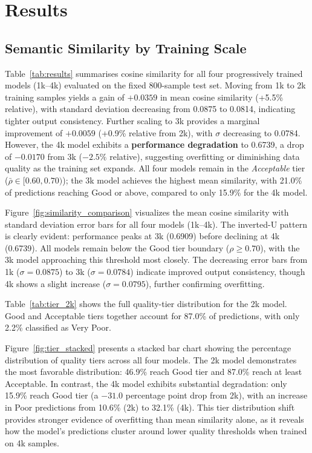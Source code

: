 \documentclass[twocolumn]{article}
\begin{document}
\section{Results}
\label{sec:results}

\subsection{Semantic Similarity by Training Scale}

Table~\ref{tab:results} summarises cosine similarity for all four progressively
trained models (1k--4k) evaluated on the fixed 800-sample test set.
Moving from 1k to 2k training samples yields a gain of $+0.0359$ in mean
cosine similarity (+5.5\% relative), with standard deviation decreasing from
0.0875 to 0.0814, indicating tighter output consistency.
Further scaling to 3k provides a marginal improvement of $+0.0059$
(+0.9\% relative from 2k), with $\sigma$ decreasing to 0.0784.
However, the 4k model exhibits a \textbf{performance degradation} to 0.6739,
a drop of $-0.0170$ from 3k ($-2.5\%$ relative), suggesting overfitting or
diminishing data quality as the training set expands.
All four models remain in the \textit{Acceptable} tier ($\bar{\rho}\in[0.60,0.70)$);
the 3k model achieves the highest mean similarity, with 21.0\% of predictions
reaching Good or above, compared to only 15.9\% for the 4k model.

Figure~\ref{fig:similarity_comparison} visualizes the mean cosine similarity
with standard deviation error bars for all four models (1k--4k).
The inverted-U pattern is clearly evident: performance peaks at 3k (0.6909)
before declining at 4k (0.6739).
All models remain below the Good tier boundary ($\rho\geq 0.70$), with the
3k model approaching this threshold most closely.
The decreasing error bars from 1k ($\sigma=0.0875$) to 3k ($\sigma=0.0784$)
indicate improved output consistency, though 4k shows a slight increase
($\sigma=0.0795$), further confirming overfitting.

Table~\ref{tab:tier_2k} shows the full quality-tier distribution for the
2k model.
Good and Acceptable tiers together account for 87.0\% of predictions,
with only 2.2\% classified as Very Poor.

Figure~\ref{fig:tier_stacked} presents a stacked bar chart showing the
percentage distribution of quality tiers across all four models.
The 2k model demonstrates the most favorable distribution: 46.9\% reach
Good tier and 87.0\% reach at least Acceptable.
In contrast, the 4k model exhibits substantial degradation: only 15.9\%
reach Good tier (a $-31.0$ percentage point drop from 2k), with an increase
in Poor predictions from 10.6\% (2k) to 32.1\% (4k).
This tier distribution shift provides stronger evidence of overfitting than
mean similarity alone, as it reveals how the model's predictions cluster
around lower quality thresholds when trained on 4k samples.
\end{document}
